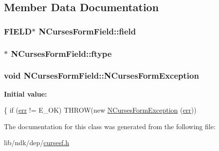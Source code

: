 \subsection{Member Data Documentation}
\hypertarget{class_n_curses_form_field_a1702927c89099dd48638e80bd71e9ee0}{
\subsubsection[{field}]{\setlength{\rightskip}{0pt plus 5cm}F\-I\-E\-L\-D$\ast$ N\-Curses\-Form\-Field\-::field\hspace{0.3cm}{\ttfamily [protected]}}}\label{class_n_curses_form_field_a1702927c89099dd48638e80bd71e9ee0}
\hypertarget{class_n_curses_form_field_a5c11bb279f5e95777335788b26828b81}{
\subsubsection[{ftype}]{$\ast$ N\-Curses\-Form\-Field\-::ftype\hspace{0.3cm}{\ttfamily [protected]}}}\label{class_n_curses_form_field_a5c11bb279f5e95777335788b26828b81}
\hypertarget{class_n_curses_form_field_a67c74669c2cb8f4599d99ebef593d556}{
\subsubsection[{N\-Curses\-Form\-Exception}]{\setlength{\rightskip}{0pt plus 5cm}void N\-Curses\-Form\-Field\-::\-N\-Curses\-Form\-Exception\hspace{0.3cm}{\ttfamily [protected]}}}\label{class_n_curses_form_field_a67c74669c2cb8f4599d99ebef593d556}
{\bfseries Initial value\-:}
\begin{DoxyCode}
\{
    \textcolor{keywordflow}{if} (\hyperlink{group__system_ga7fe7f475639e26334606b5142c29551f}{err} != E\_OK)
      THROW(\textcolor{keyword}{new} \hyperlink{class_n_curses_form_field_a67c74669c2cb8f4599d99ebef593d556}{NCursesFormException} (\hyperlink{group__system_ga7fe7f475639e26334606b5142c29551f}{err}))
\end{DoxyCode}


The documentation for this class was generated from the following file\-:\begin{DoxyCompactItemize}
\item 
lib/ndk/dep/\hyperlink{cursesf_8h}{cursesf.\-h}\end{DoxyCompactItemize}
